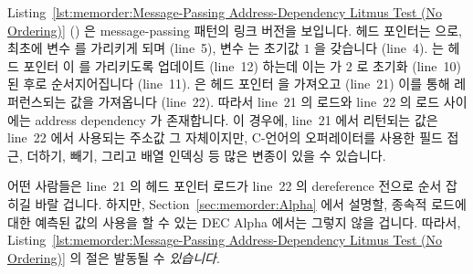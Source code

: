 Listing~\ref{lst:memorder:Message-Passing Address-Dependency Litmus Test (No Ordering)}
()
은 message-passing 패턴의 링크 버전을 보입니다.
헤드 포인터는  으로, 최초에  변수  를 가리키게 되며
(line~5), 변수  는 초기값 $1$ 을 갖습니다 (line~4).
 는 헤드 포인터  이  를 가리키도록 업데이트 (line~12)
하는데 이는  가 $2$ 로 초기화 (line~10) 된 후로 순서지어집니다
(line~11).
 은 헤드 포인터  을 가져오고 (line~21) 이를 통해 레퍼런스되는
값을 가져옵니다 (line~22).
따라서 line~21 의 로드와 line~22 의 로드 사이에는 address dependency 가
존재합니다.
이 경우에, line~21 에서 리턴되는 값은 line~22 에서 사용되는 주소값 그
자체이지만, C-언어의 \co{->} 오퍼레이터를 사용한 필드 접근, 더하기, 빼기,
그리고 배열 인덱싱 등 많은 변종이 있을 수 있습니다.

어떤 사람들은 line~21 의 헤드 포인터 로드가 line~22 의 dereference 전으로 순서
잡히길 바랄 겁니다.
하지만,
Section~\ref{sec:memorder:Alpha} 에서 설명할, 종속적 로드에 대한 예측된 값의
사용을 할 수 있는 DEC Alpha 에서는 그렇지 않을 겁니다.
따라서,
Listing~\ref{lst:memorder:Message-Passing Address-Dependency Litmus Test (No Ordering)}
의  절은 발동될 수 \emph{있습니다}.

